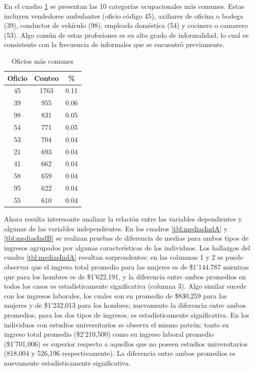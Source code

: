 \documentclass[11pt,a4paper]{article}
\begin{document}
  En el cuadro \ref{tbl:oficiosComunes} se presentan las 10 categorías ocupacionales más comunes. Estas incluyen vendedores ambulantes (oficio código 45), axiliares de oficina o bodega (39), conductor de vehículo (98), empleada doméstica (54) y cocinero o camarero (53). Algo común de estas profesiones es su alto grado de informalidad, lo cual es consistente con la frecuencia de informales que se encuentró previamente.

    \begin{table}[H]
      \centering
      \caption{Oficios más comunes} 
      \label{tab:oficios_freq}
      \begingroup\fontsize{9pt}{10pt}\selectfont  
    \begin{tabular}{ccc}
      \hline
      Oficio & Conteo & \%\\
      \hline
      45 & 1763 & 0.11\\
      39 & 955 & 0.06\\
      98 & 831 & 0.05\\
      54 & 771 & 0.05\\
      53 & 704 & 0.04\\
      21 & 693 & 0.04\\
      41 & 662 & 0.04\\
      58 & 659 & 0.04\\
      95 & 622 & 0.04\\
      55 & 610 & 0.04\\
      \hline
      \end{tabular}   
      \endgroup
      \label{tbl:oficiosComunes}
    \end{table}

    Ahora resulta interesante analizar la relación entre las variables dependientes y algunas de las variables independientes.
    En los cuadros \ref{tbl:mediasIndA} y \ref{tbl:mediasIndB} se realizan pruebas de diferencia de medias para ambos tipos de ingresos agrupados por algunas características de los individuos. Los hallazgos del cuadro \ref{tbl:mediasIndA} resultan sorprendentes: en las columnas 1 y 2 se 
    puede observar que el ingreso total promedio para las mujeres es de \$1'144.787 mientras que para los hombres es de \$1'622,191, y la diferencia entre ambos promedios en todos los casos es estadísticamente significativa (columna 3). 
    Algo similar sucede con los ingresos laborales, los cuales son en promedio de \$830,259 para las mujeres y de \$1'232,013 para los hombres; nuevamente la diferencia entre ambos promedios, para los dos tipos de ingresos, es estadísticamente significativa.
    En los individuos con estudios universitarios se observa el mismo patrón: tanto su ingreso total promedio (\$2'210,500) como su ingreso laboral promedio (\$1'701,006) es superior respecto a aquellos que no poseen estudios universitarios (818,004 y 526,196 respectivamente).
    La diferencia entre ambos promedios es nuevamente estadísticamente significativa.
    
\end{document}
